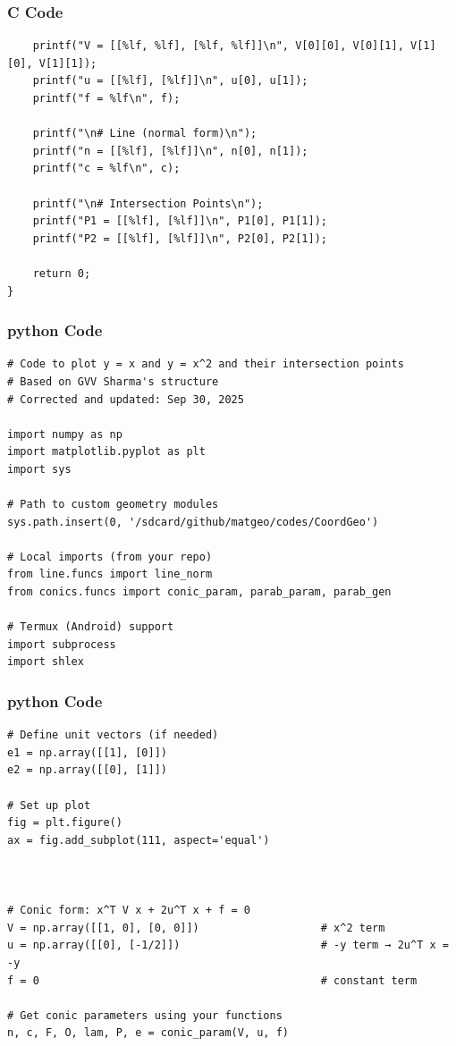 \documentclass{beamer}
\begin{document}
\begin{frame}[fragile]
    \frametitle{C Code }
    \begin{lstlisting}
    printf("V = [[%lf, %lf], [%lf, %lf]]\n", V[0][0], V[0][1], V[1][0], V[1][1]);
    printf("u = [[%lf], [%lf]]\n", u[0], u[1]);
    printf("f = %lf\n", f);

    printf("\n# Line (normal form)\n");
    printf("n = [[%lf], [%lf]]\n", n[0], n[1]);
    printf("c = %lf\n", c);

    printf("\n# Intersection Points\n");
    printf("P1 = [[%lf], [%lf]]\n", P1[0], P1[1]);
    printf("P2 = [[%lf], [%lf]]\n", P2[0], P2[1]);

    return 0;
}

    \end{lstlisting}
\end{frame}
\begin{frame}[fragile]
    \frametitle{python Code }
    \begin{lstlisting}
# Code to plot y = x and y = x^2 and their intersection points
# Based on GVV Sharma's structure
# Corrected and updated: Sep 30, 2025

import numpy as np
import matplotlib.pyplot as plt
import sys

# Path to custom geometry modules
sys.path.insert(0, '/sdcard/github/matgeo/codes/CoordGeo')

# Local imports (from your repo)
from line.funcs import line_norm
from conics.funcs import conic_param, parab_param, parab_gen

# Termux (Android) support
import subprocess
import shlex

  \end{lstlisting}
\end{frame}
\begin{frame}[fragile]
    \frametitle{python Code }
    \begin{lstlisting}
# Define unit vectors (if needed)
e1 = np.array([[1], [0]])
e2 = np.array([[0], [1]])

# Set up plot
fig = plt.figure()
ax = fig.add_subplot(111, aspect='equal')



# Conic form: x^T V x + 2u^T x + f = 0
V = np.array([[1, 0], [0, 0]])                   # x^2 term
u = np.array([[0], [-1/2]])                      # -y term → 2u^T x = -y
f = 0                                            # constant term

# Get conic parameters using your functions
n, c, F, O, lam, P, e = conic_param(V, u, f)
\end{lstlisting}
\end{frame}
\end{document}
